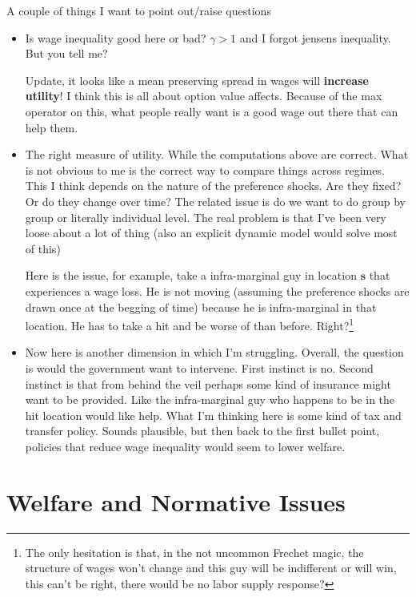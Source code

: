 \documentclass[pdftex,12pt]{article}
\begin{document}
A couple of things I want to point out/raise questions
\begin{itemize}
\item Is wage inequality good here or bad? $\gamma > 1$ and I forgot jensens inequality. But you tell me?

    Update, it looks like a mean preserving spread in wages will \textbf{increase utility}! I think this is all about option value affects. Because of the max operator on this, what people really want is a good wage out there that can help them.

\item The right measure of utility. While the computations above are correct. What is not obvious to me is the correct way to compare things across regimes. This I think depends on the nature of the preference shocks. Are they fixed? Or do they change over time? The related issue is do we want to do group by group or literally individual level. The real problem is that I've been very loose about a lot of thing (also an explicit dynamic model would solve most of this)
    
    Here is the issue, for example, take a infra-marginal guy in location $\textbf{s}$ that experiences a wage loss. He is not moving (assuming the preference shocks are drawn once at the begging of time) because he is infra-marginal in that location. He has to take a hit and be worse of than before. Right?\footnote{The only hesitation is that, in the not uncommon Frechet magic, the structure of wages won't change and this guy will be indifferent or will win, this can't be right, there would be no labor supply response?}
    
\item Now here is another dimension in which I'm struggling. Overall, the question is would the government want to intervene. First instinct is no. Second instinct is that from behind the veil perhaps some kind of insurance might want to be provided. Like the infra-marginal guy who happens to be in the hit location would like help. What I'm thinking here is some kind of tax and transfer policy. Sounds plausible, but then back to the first bullet point, policies that reduce wage inequality would seem to lower welfare.

\end{itemize}


\newpage

\section{Welfare and Normative Issues}





\newpage

\small

\end{document}
